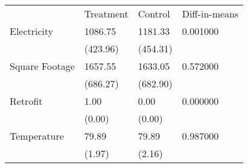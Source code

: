 \begin{tabular}{llll}
 & Treatment & Control & Diff-in-means \\
Electricity & 1086.75 & 1181.33 & 0.001000 \\
  & (423.96) & (454.31) &   \\
Square Footage & 1657.55 & 1633.05 & 0.572000 \\
  & (686.27) & (682.90) &   \\
Retrofit & 1.00 & 0.00 & 0.000000 \\
  & (0.00) & (0.00) &   \\
Temperature & 79.89 & 79.89 & 0.987000 \\
  & (1.97) & (2.16) &   \\
\end{tabular}
